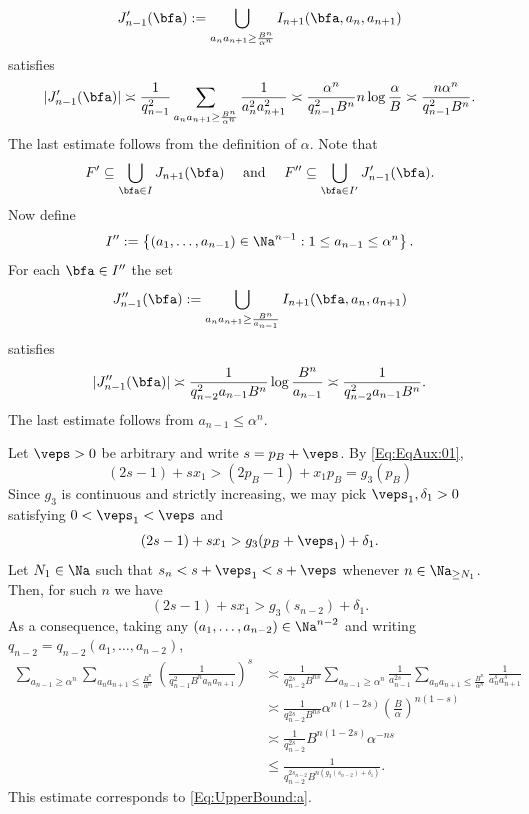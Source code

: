 \documentclass[12pt,a4paper]{amsart}
\begin{document}
\[
J_{n-1}'(\bfa)
:=
\bigcup_{a_{n}a_{n+1} \geq \frac{B^n}{\alpha^n } } I_{n+1}(\bfa, a_n, a_{n+1})
\]
satisfies
\begin{equation}\label{Eq:UpperBound:b}
|J_{n-1}'(\bfa)|
\asymp
\frac{1}{q_{n-1}^2}
\sum_{a_{n}a_{n+1} \geq \frac{B^n}{\alpha^n } } 
\frac{1}{a_{n}^2a_{n+1}^2}
\asymp
\frac{\alpha^n}{q_{n-1}^2B^n}n \log\frac{\alpha}{B}
\asymp
\frac{n\alpha^n}{q_{n-1}^2B^n}.
\end{equation}
The last estimate follows from the definition of $\alpha$. Note that 
\[
F'\subseteq\bigcup_{\bfa\in I} J_{n+1}(\bfa)
\quad\text{ and }\quad
F''\subseteq\bigcup_{\bfa\in I'} J_{n-1}'(\bfa).
\]
Now define
\[
I''
:=
\left\{ (a_1,\ldots, a_{n-1})\in \Na^{n-1}: 1\leq a_{n-1}\leq \alpha^n\right\}.
\]
For each $\bfa\in I''$ the set 
\[
J_{n-1}''(\bfa)
:=
\bigcup_{a_{n}a_{n+1}\geq \frac{B^n}{a_{n-1}}} I_{n+1}(\bfa, a_n, a_{n+1})
\]
satisfies
\begin{equation}\label{Eq:UpperBound:c}
|J_{n-1}''(\bfa)|
\asymp
\frac{1}{q_{n-2}^2a_{n-1}B^n}\log \frac{B^n}{a_{n-1}}
\asymp
\frac{1}{q_{n-2}^2a_{n-1}B^n}.
\end{equation}
The last estimate follows from $a_{n-1}\leq \alpha^n$. 

Let $\veps>0$ be arbitrary and write $s=p_B+\veps$. By \eqref{Eq:EqAux:01}, 
\[
(2s-1) + sx_1
> 
(2p_B-1)+x_1p_B
=g_3(p_B)
\]
Since $g_3$ is continuous and strictly increasing, we may pick $\veps_1,\delta_1>0$ satisfying $0<\veps_1<\veps$ and 
\[
(2s-1) + sx_1
>
g_3(p_B+\veps_1) + \delta_1.
\]
Let $N_1\in\Na$ such that $s_n<s + \veps_1<s+\veps$ whenever $n\in\Na_{\geq N_1}$. Then, for such $n$ we have
\[
(2s-1) + sx_1
>
g_3(s_{n-2}) + \delta_1.
\]
As a consequence, taking any $(a_1,\ldots, a_{n-2})\in\Na^{n-2}$ and writing $q_{n-2}=q_{n-2}(a_1,\ldots, a_{n-2})$,
\begin{align*}
\sum_{a_{n-1}\geq \alpha^n} 
\sum_{a_n a_{n+1}\leq \frac{B^n}{\alpha^n}}
 \left( \frac{1}{q_{n-1}^2 B^n a_{n}a_{n+1}} \right)^s
&\asymp 
\frac{1}{q_{n-2}^{2s}B^{ns}}
\sum_{a_{n-1}\geq \alpha^n} 
\frac{1}{a_{n-1}^{2s}}
\sum_{a_n a_{n+1}\leq \frac{B^n}{\alpha^n}}
\frac{1}{a_{n}^{s}a_{n+1}^{s}} \\
&\asymp 
\frac{1}{q_{n-2}^{2s}B^{ns}}
\alpha^{n(1-2s)}
\left(\frac{B}{\alpha}\right)^{n(1-s)} \\
&\asymp 
\frac{1}{q_{n-2}^{2s}}
B^{n(1-2s)} \alpha^{-ns}  \\
&\leq 
\frac{1}{q_{n-2}^{2s_{n-2}} B^{n(g_3(s_{n-2}) + \delta_1)}}.
\end{align*}
This estimate corresponds to \eqref{Eq:UpperBound:a}.
\end{document}
